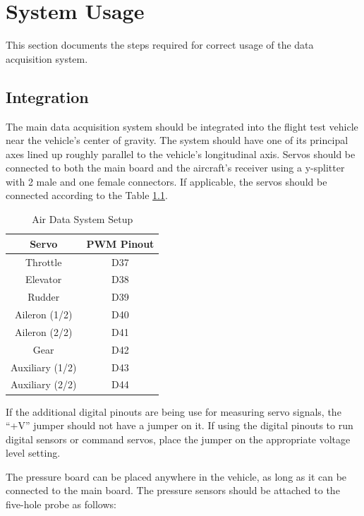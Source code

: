 \chapter{System Usage}
This section documents the steps required for correct usage of the data acquisition system.

\section{Integration}
The main data acquisition system should be integrated into the flight test vehicle near the vehicle's center of gravity. The system should have one of its principal axes lined up roughly parallel to the vehicle's longitudinal axis. Servos should be connected to both the main board and the aircraft's receiver using a y-splitter with 2 male and one female connectors. If applicable, the servos should be connected according to the Table \ref{table:servoSetup}.
\begin{table}[ht]
\caption{Air Data System Setup} %
\centering %
\begin{tabular}{c c} %
\hline\hline %
 Servo & PWM Pinout\\
\hline %
Throttle & D37\\
Elevator & D38\\
Rudder & D39\\ 
Aileron (1/2) & D40\\
Aileron (2/2) & D41\\
Gear & D42\\
Auxiliary (1/2)& D43\\
Auxiliary (2/2)& D44\\
\hline
\end{tabular}
\label{table:servoSetup}
\end{table}

If the additional digital pinouts are being use for measuring servo signals, the ``+V'' jumper should not have a jumper on it. If using the digital pinouts to run digital sensors or command servos, place the jumper on the appropriate voltage level setting.

The pressure board can be placed anywhere in the vehicle, as long as it can be connected to the main board. The pressure sensors should be attached to the five-hole probe as follows:


